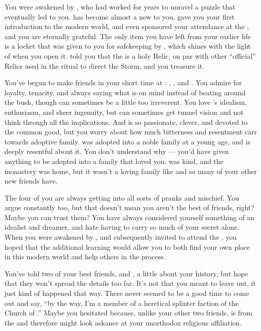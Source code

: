 \documentclass[char]{GL2020}
\begin{document}
You were awakened by \cWildCard{\full}, who had worked for years to unravel a puzzle that eventually led \cWildCard{\them} to you. \cWildCard{} has become almost a new \cWildCard{\parent} to you, gave you your first introduction to the modern world, and even sponsored your attendance at the \pSchool{}, and you are eternally grateful. The only item you have left from your earlier life is a locket that was given to you for safekeeping by \cDisneyMentor{}, which shines with the light of \cFarmGod{} when you open it. \cDisneyMentor{} told you that the \iLocket{} is a holy Relic, on par with other ``official'' Relics used in the ritual to direct the Storm, and you treasure it.

You've begun to make friends in your short time at \pSchool{}: \cPirateChild{\full}, \cTechStar{\full}, and \cAdopted{\full}. You admire \cPirateChild{} for \cPirateChild{\their} loyalty, tenacity, and always saying what is on \cPirateChild{\their} mind instead of beating around the bush, though \cPirateChild{\they} can sometimes be a little too irreverent. You love \cTechStar{}’s idealism, enthusiasm, and sheer ingenuity, but \cTechStar{\they} can sometimes get tunnel vision and not think through all the implications. And \cAdopted{} is so passionate, clever, and devoted to the common good, but you worry about how much bitterness and resentment \cAdopted{\they} carr\cAdopted{\verby} towards \cAdopted{\their} adoptive family. \cAdopted{} was adopted into a noble family at a young age, and is deeply resentful about it. You don't understand why — you'd have given anything to be adopted into a family that loved you. \cDisneyMentor{} was kind, and the monastery was home, but it wasn't a loving family like \cAdopted{} and so many of your other new friends have.

The four of you are always getting into all sorts of pranks and mischief. You argue constantly too, but that doesn't mean you aren't the best of friends, right? Maybe you can trust them? You have always considered yourself something of an idealist and dreamer, and hate having to carry so much of your secret alone. When you were awakened by \cWildCard{}, and subsequently invited to attend the \pSchool{}, you hoped that the additional learning would allow you to both find your own place in this modern world and help others in the process.

You've told two of your best friends, \cPirateChild{} and \cTechStar{}, a little about your history, but hope that they won't spread the details too far. It's not that you meant to leave \cAdopted{} out, it just kind of happened that way. There never seemed to be a good time to come out and say, ``by the way, I'm a member of a heretical splinter faction of the Church of \cFarmGod{}.'' Maybe you hesitated because, unlike your other two friends, \cAdopted{} is from the \pFarm{}and therefore might look askance at your unorthodox religious affiliation.
\end{document}
